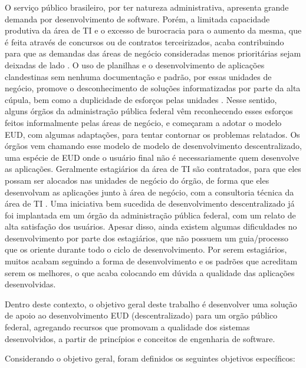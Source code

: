 O serviço público brasileiro, por ter natureza administrativa, apresenta grande demanda por desenvolvimento de software. Porém, a limitada capacidade produtiva da área de TI e o excesso de burocracia para o aumento da mesma, que é feita através de concursos ou de contratos terceirizados, acaba contribuindo para que as demandas das áreas de negócio consideradas menos prioritárias sejam deixadas de lado \cite{artigoTcuGovTI}. O uso de planilhas e o desenvolvimento de aplicações clandestinas sem nenhuma documentação e padrão, por essas unidades de negócio, promove o desconhecimento de soluções informatizadas por parte da alta cúpula, bem como a duplicidade de esforços pelas unidades \cite{slideTCU}. Nesse sentido, alguns órgãos da administração pública federal vêm reconhecendo esses esforços feitos informalmente pelas áreas de negócio, e começaram a adotar o modelo EUD, com algumas adaptações, para tentar contornar os problemas relatados. Os órgãos vem chamando esse modelo de modelo de desenvolvimento descentralizado, uma espécie de EUD onde o usuário final não é necessariamente quem desenvolve as aplicações. Geralmente estagiários da área de TI são contratados, para que eles possam ser alocados nas unidades de negócio do órgão, de forma que eles desenvolvam as aplicações junto à área de negócio, com a consultoria técnica da área de TI \cite{slideTCU}. Uma iniciativa bem sucedida de desenvolvimento descentralizado já foi implantada em um órgão da administração pública federal, com um relato de alta satisfação dos usuários. Apesar disso, ainda existem algumas dificuldades no desenvolvimento por parte dos estagiários, que não possuem um guia/processo que os oriente durante todo o ciclo de desenvolvimento. Por serem estagiários, muitos acabam seguindo a forma de desenvolvimento e os padrões que acreditam serem os melhores, o que acaba colocando em dúvida a qualidade das aplicações desenvolvidas. 

Dentro deste contexto, o objetivo geral deste trabalho é desenvolver uma solução de apoio ao desenvolvimento EUD (descentralizado) para um orgão público federal, agregando recursos que promovam a qualidade dos sistemas desenvolvidos, a partir de princípios e conceitos de engenharia de software.

Considerando o objetivo geral, foram definidos os seguintes objetivos específicos:

